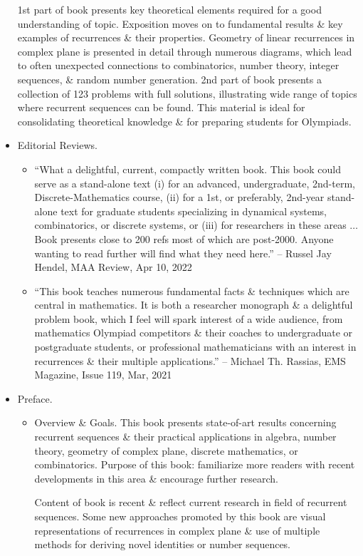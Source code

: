 \documentclass{article}
\begin{document}
\begin{itemize}
	1st part of book presents key theoretical elements required for a good understanding of topic. Exposition moves on to fundamental results \& key examples of recurrences \& their properties. Geometry of linear recurrences in complex plane is presented in detail through numerous diagrams, which lead to often unexpected connections to combinatorics, number theory, integer sequences, \& random number generation. 2nd part of book presents a collection of 123 problems with full solutions, illustrating wide range of topics where recurrent sequences can be found. This material is ideal for consolidating theoretical knowledge \& for preparing students for Olympiads.
	\item {\sf Editorial Reviews.}
	\begin{itemize}
		\item ``What a delightful, current, compactly written book. This book could serve as a stand-alone text (i) for an advanced, undergraduate, 2nd-term, Discrete-Mathematics course, (ii) for a 1st, or preferably, 2nd-year stand-alone text  for graduate students specializing in dynamical systems, combinatorics, or discrete systems, or (iii) for researchers in these areas $\ldots$ Book presents close to 200 refs most of which are post-2000. Anyone wanting to read further will find what they need here.'' -- {\sc Russel Jay Hendel}, MAA Review, Apr 10, 2022
		\item ``This book teaches numerous fundamental facts \& techniques which are central in mathematics. It is both a researcher monograph \& a delightful problem book, which I feel will spark interest of a wide audience, from mathematics Olympiad competitors \& their coaches to undergraduate or postgraduate students, or professional mathematicians with an interest in recurrences \& their multiple applications.'' -- {\sc Michael Th. Rassias}, EMS Magazine, Issue 119, Mar, 2021
	\end{itemize}
	\item {\sf Preface.}
	\begin{itemize}
		\item {\sf Overview \& Goals.} This book presents state-of-art results concerning recurrent sequences \& their practical applications in algebra, number theory, geometry of complex plane, discrete mathematics, or combinatorics. Purpose of this book: familiarize more readers with recent developments in this area \& encourage further research.
		
		Content of book is recent \& reflect current research in field of recurrent sequences. Some new approaches promoted by this book are visual representations of recurrences in complex plane \& use of multiple methods for deriving novel identities or number sequences.
		

\end{itemize}
\end{itemize}
\end{document}
